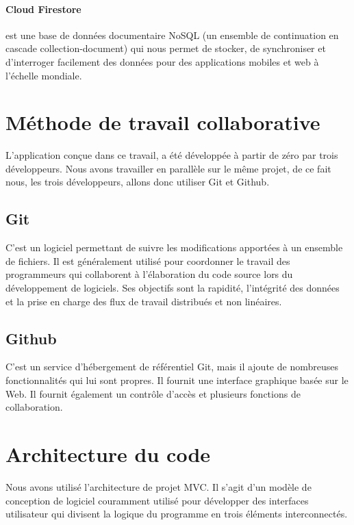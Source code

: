 \documentclass[french, a4paper, 12pt]{report}
\begin{document}
				\paragraph*{Cloud Firestore} est une base de données documentaire NoSQL (un ensemble de continuation en cascade collection-document) qui nous permet de stocker, de synchroniser et d'interroger facilement des données pour des applications mobiles et web à l'échelle mondiale.
	\section{Méthode de travail collaborative}
		L'application conçue dans ce travail, a été développée à partir de zéro par trois développeurs. Nous avons travailler en parallèle sur le même projet, de ce fait nous, les trois développeurs, allons donc utiliser Git et Github.

		\subsection*{Git} C'est un logiciel permettant de suivre les modifications apportées à un ensemble de fichiers. Il est généralement utilisé pour coordonner le travail des programmeurs qui collaborent à l'élaboration du code source lors du développement de logiciels. Ses objectifs sont la rapidité, l'intégrité des données et la prise en charge des flux de travail distribués et non linéaires.

		\subsection*{Github} C'est un service d'hébergement de référentiel Git, mais il ajoute de nombreuses fonctionnalités qui lui sont propres. Il fournit une interface graphique basée sur le Web. Il fournit également un contrôle d'accès et plusieurs fonctions de collaboration.
	\section{Architecture du code} %
		Nous avons utilisé l'architecture de projet MVC. Il s'agit d'un modèle de conception de logiciel couramment utilisé pour développer des interfaces utilisateur qui divisent la logique du programme en trois éléments interconnectés.
\end{document}
